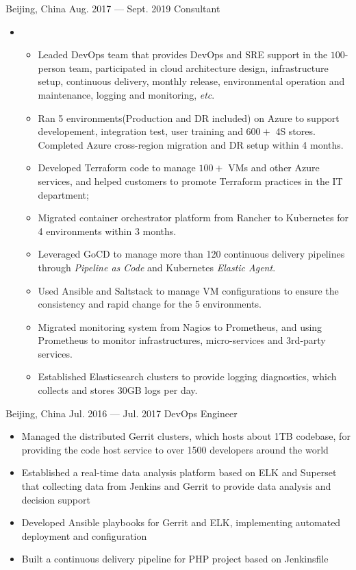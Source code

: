 \documentclass{resume}
\begin{document}
\begin{body}
	{Beijing, China}
	{Aug. 2017 --- Sept. 2019}
	{Consultant}
	\begin{itemize}[noitemsep,topsep=0pt]
		\item {}
		\begin{itemize}[noitemsep,topsep=0pt]
			\item Leaded DevOps team that provides DevOps and SRE support in the $100$-person team, participated in cloud architecture design, infrastructure setup, continuous delivery, monthly release, environmental operation and maintenance, logging and monitoring, \textit{etc}.
			\item Ran 5 environments(Production and DR included) on Azure to support developement, integration test, user training and $600+$ 4S stores. Completed Azure cross-region migration and DR setup within 4 months.
			\item Developed Terraform code to manage $100+$ VMs and other Azure services, and helped customers to promote Terraform practices in the IT department;
			\item Migrated container orchestrator platform from Rancher to Kubernetes for 4 environments within 3 months.
			\item Leveraged GoCD to manage more than 120 continuous delivery pipelines through \textit{Pipeline as Code} and Kubernetes \textit{Elastic Agent}.
			\item Used Ansible and Saltstack to manage VM configurations to ensure the consistency and rapid change for the 5 environments.
			\item Migrated monitoring system from Nagios to Prometheus, and using Prometheus to monitor infrastructures, micro-services and 3rd-party services.
			\item Established Elasticsearch clusters to provide logging diagnostics, which collects and stores 30GB logs per day.
		\end{itemize}
	\end{itemize}
\end{body}

\smallskip
\begin{body}
	{Beijing, China}
	{Jul. 2016 --- Jul. 2017}
	{DevOps Engineer}
	\begin{itemize}[noitemsep,topsep=0pt]
		\item Managed the distributed Gerrit clusters, which hosts about 1TB codebase, for providing the code host service to over 1500 developers around the world
		\item Established a real-time data analysis platform based on ELK and Superset that collecting data from Jenkins and Gerrit to provide data analysis and decision support
		\item Developed Ansible playbooks for Gerrit and ELK, implementing automated deployment and configuration
		\item Built a continuous delivery pipeline for PHP project based on Jenkinsfile
	\end{itemize}
\end{body}
\end{document}
